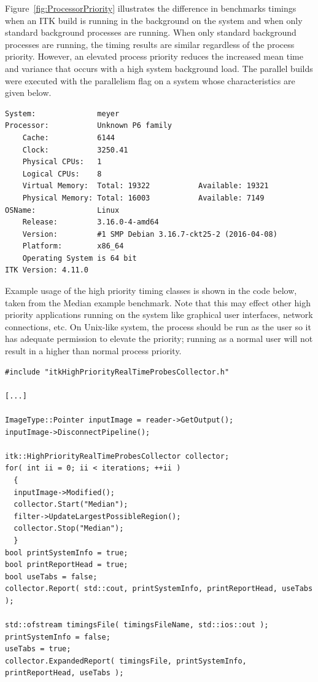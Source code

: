 \documentclass{InsightArticle}
\begin{document}
Figure~\ref{fig:ProcessorPriority} illustrates the difference in benchmarks
timings when an ITK build is running in the background on the system and when
only standard background processes are running. When only standard background
processes are running, the timing results are similar regardless of the
process priority. However, an elevated process priority reduces the increased
mean time and variance that occurs with a high system background load. The
parallel builds were executed with the  parallelism flag on a
system whose characteristics are given below.

\begin{verbatim}
System:              meyer
Processor:           Unknown P6 family
    Cache:           6144
    Clock:           3250.41
    Physical CPUs:   1
    Logical CPUs:    8
    Virtual Memory:  Total: 19322           Available: 19321
    Physical Memory: Total: 16003           Available: 7149
OSName:              Linux
    Release:         3.16.0-4-amd64
    Version:         #1 SMP Debian 3.16.7-ckt25-2 (2016-04-08)
    Platform:        x86_64
    Operating System is 64 bit
ITK Version: 4.11.0
\end{verbatim}

Example usage of the high priority timing classes is shown in the code below,
taken from the Median example benchmark. Note that this may effect other high
priority applications running on the system like graphical user interfaces,
network connections, etc. On Unix-like system, the process should be run as the
 user so it has adequate permission to elevate the priority; running
as a normal user will not result in a higher than normal process priority.

\begin{verbatim}
#include "itkHighPriorityRealTimeProbesCollector.h"

[...]

ImageType::Pointer inputImage = reader->GetOutput();
inputImage->DisconnectPipeline();

itk::HighPriorityRealTimeProbesCollector collector;
for( int ii = 0; ii < iterations; ++ii )
  {
  inputImage->Modified();
  collector.Start("Median");
  filter->UpdateLargestPossibleRegion();
  collector.Stop("Median");
  }
bool printSystemInfo = true;
bool printReportHead = true;
bool useTabs = false;
collector.Report( std::cout, printSystemInfo, printReportHead, useTabs );

std::ofstream timingsFile( timingsFileName, std::ios::out );
printSystemInfo = false;
useTabs = true;
collector.ExpandedReport( timingsFile, printSystemInfo, printReportHead, useTabs );
\end{verbatim}
\end{document}

